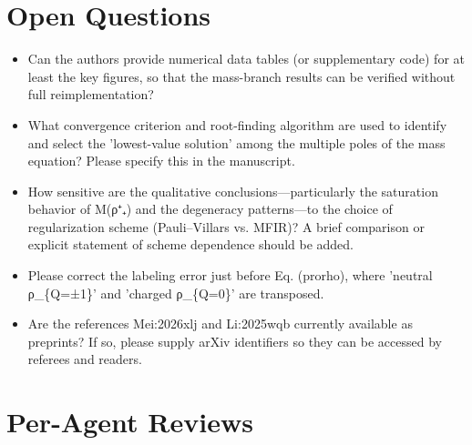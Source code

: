 \documentclass[11pt]{article}
\begin{document}
\section*{Open Questions}
\begin{itemize}[leftmargin=*]
  \item Can the authors provide numerical data tables (or supplementary code) for at least the key figures, so that the mass-branch results can be verified without full reimplementation?
  \item What convergence criterion and root-finding algorithm are used to identify and select the 'lowest-value solution' among the multiple poles of the mass equation? Please specify this in the manuscript.
  \item How sensitive are the qualitative conclusions—particularly the saturation behavior of M(ρ⁺₊) and the degeneracy patterns—to the choice of regularization scheme (Pauli–Villars vs. MFIR)? A brief comparison or explicit statement of scheme dependence should be added.
  \item Please correct the labeling error just before Eq. (prorho), where 'neutral ρ\_\{Q=±1\}' and 'charged ρ\_\{Q=0\}' are transposed.
  \item Are the references Mei:2026xlj and Li:2025wqb currently available as preprints? If so, please supply arXiv identifiers so they can be accessed by referees and readers.
\end{itemize}

\section*{Per-Agent Reviews}
\end{document}
